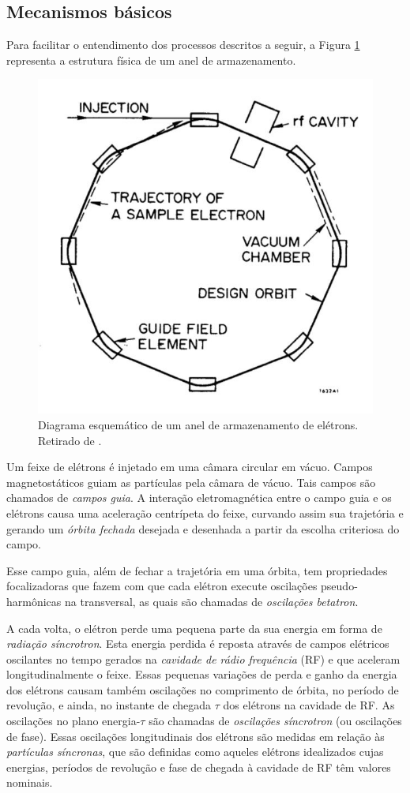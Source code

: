 \subsection{Mecanismos básicos}
Para facilitar o entendimento dos processos descritos a seguir, a Figura \ref{fig:ring} representa a estrutura física de um anel de armazenamento.
	
\begin{figure}[!htb]
	\centering
	\includegraphics[width=0.6\linewidth]{./Figuras/fig1.jpeg}
	\caption{Diagrama esquemático de um anel de armazenamento de elétrons. Retirado de \cite{sands1970physics}.}
	\label{fig:ring}
\end{figure}
	
Um feixe de elétrons é injetado em uma câmara circular em vácuo. Campos magnetostáticos guiam as partículas pela câmara de vácuo. Tais campos são chamados de \emph{campos guia}. A interação eletromagnética entre o campo guia e os elétrons causa uma aceleração centrípeta do feixe, curvando assim sua trajetória e gerando um \emph{órbita fechada} desejada e desenhada a partir da escolha criteriosa do campo.
	
Esse campo guia, além de fechar a trajetória em uma órbita, tem propriedades focalizadoras que fazem com que cada elétron execute oscilações pseudo-harmônicas na transversal, as quais são chamadas de \emph{oscilações betatron}.
	
A cada volta, o elétron perde uma pequena parte da sua energia em forma de \emph{radiação síncrotron}. Esta energia perdida é reposta através de campos elétricos oscilantes no tempo gerados na \emph{cavidade de rádio frequência} (RF) e que aceleram longitudinalmente o feixe. Essas pequenas variações de perda e ganho da energia dos elétrons causam também oscilações no comprimento de órbita, no período de revolução, e ainda, no instante de chegada $\tau$ dos elétrons na cavidade de RF. As oscilações no plano energia-$\tau$ são chamadas de \emph{oscilações síncrotron} (ou oscilações de fase). Essas oscilações longitudinais dos elétrons são medidas em relação às \emph{partículas síncronas}, que são definidas como aqueles elétrons idealizados cujas energias, períodos de revolução e fase de chegada à cavidade de RF têm valores nominais.

